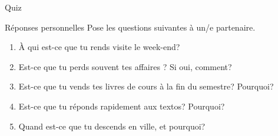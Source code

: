 \documentclass{beamer}
\begin{document}
  \begin{frame}{}
    \begin{center}
      \Large Quiz
    \end{center}
  \end{frame}

  \begin{frame}{Réponses personnelles}
    Pose les questions suivantes à un/e partenaire. \\
    \begin{center}
      \begin{enumerate}
        \item À qui est-ce que tu rends visite le week-end?
        \item Est-ce que tu perds souvent tes affaires ? Si oui, comment?
        \item Est-ce que tu vends tes livres de cours à la fin du semestre? Pourquoi?
        \item Est-ce que tu réponds rapidement aux textos? Pourquoi?
        \item Quand est-ce que tu descends en ville, et pourquoi?
      \end{enumerate}
    \end{center}
  \end{frame}
\end{document}
